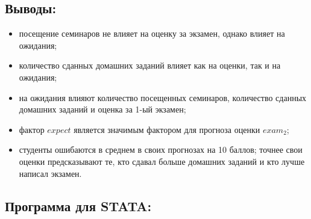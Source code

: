 \documentclass[12pt,a4paper, oneside]{extreport}
\begin{document}
\subsection{Выводы:}
\begin{itemize}
	\item посещение семинаров не влияет на оценку за экзамен, однако влияет на ожидания;
	\item количество сданных домашних заданий влияет как на оценки, так и на ожидания;
	\item на ожидания влияют количество посещенных семинаров, количество сданных домашних заданий и оценка за 1-ый экзамен;
	\item фактор $expect$ является значимым фактором для прогноза оценки $exam_2$;
	\item студенты ошибаются в среднем в своих прогнозах на 10 баллов; точнее свои оценки предсказывают те, кто сдавал больше домашних заданий и кто лучше написал экзамен.
\end{itemize}






\newpage
\subsection{Программа для STATA:}
\end{document}
